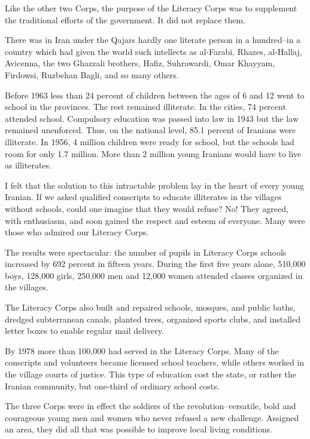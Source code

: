 Like the other two Corps, the purpose of the Literacy Corps was to supplement the traditional efforts of the government. It did not replace them. 

There was in Iran under the Qajars hardly one literate person in a hundred--in a country which had given the world such intellects as al-Farabi, Rhazes, al-Hallaj, Avicenna, the two Ghazzali brothers, Hafiz, Suhrawardi, Omar Khayyam, Firdowsi, Ruzbehan Bagli, and so many others. 

Before 1963 less than 24 percent of children between the ages of 6 and 12 went to school in the provinces. The rest remained illiterate. In the cities, 74 percent attended school. Compulsory education was passed into law in 1943 but the law remained unenforced. Thus, on the national level, 85.1 percent of Iranians were illiterate. In 1956, 4 million children were ready for school, but the schools had room for only 1.7 million. More than 2 million young Iranians would have to live as illiterates. 

I felt that the solution to this intractable problem lay in the heart of every young Iranian. If we asked qualified conscripts to educate illiterates in the villages without schools, could one imagine that they would refuse? No! They agreed, with enthusiasm, and soon gained the respect and esteem of everyone. Many were those who admired our Literacy Corps. 

The results were spectacular: the number of pupils in Literacy Corps schools increased by 692 percent in fifteen years. During the first five years alone, 510,000 boys, 128,000 girls, 250,000 men and 12,000 women attended classes organized in the villages. 

The Literacy Corps also built and repaired schools, mosques, and public baths, dredged subterranean canals, planted trees, organized sports clubs, and installed letter boxes to enable regular mail delivery. 

By 1978 more than 100,000 had served in the Literacy Corps. Many of the conscripts and volunteers became licensed school teachers, while others worked in the village courts of justice. This type of education cost the state, or rather the Iranian community, but one-third of ordinary school costs. 

The three Corps were in effect the soldiers of the revolution--versatile, bold and courageous young men and women who never refused a new challenge. Assigned an area, they did all that was possible to improve local living conditions. 

